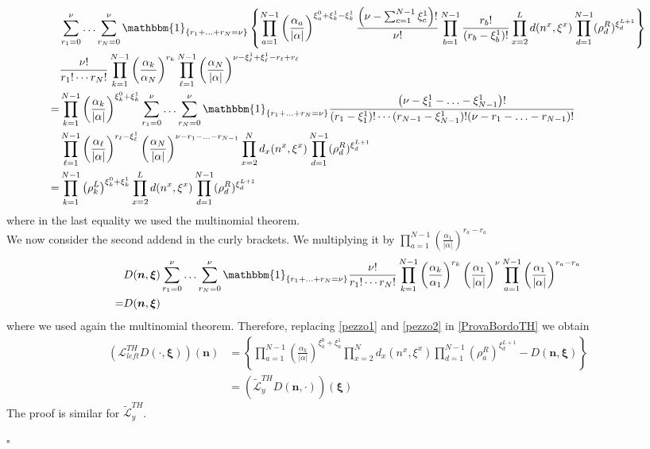 \documentclass[10pt]{article}
\numberwithin{equation}{section}
\numberwithin{equation}{subsection}
\begin{document}
\begin{align}\label{pezzo1}
	&\sum_{r_{1}=0}^{\nu}\ldots\sum_{r_{N}=0}^{\nu}\mathbbm{1}_{\{r_{1}+\ldots+r_{N}=\nu\}}\left\{\prod_{a=1}^{N-1}\left(\frac{\alpha_{a}}{|\alpha|}\right)^{\xi_{a}^{0}+\xi_{k}^{1}-\xi_{k}^{1}}\frac{\left(\nu-\sum_{c=1}^{N-1}\xi_{c}^{1}\right)!}{\nu!}\prod_{b=1}^{N-1}\frac{r_{b}!}{(r_{b}-\xi^{1}_{b})!}\prod_{x=2}^{L}d(n^{x},\xi^{x})\prod_{d=1}^{N-1}(\rho_{d}^{R})^{\xi_{d}^{L+1}}\right\}\nonumber\\&	\frac{\nu!}{r_{1}!\cdots r_{N}!}\prod_{k=1}^{N-1}\left(\frac{\alpha_{k}}{\alpha_{N}}\right)^{r_{k}}\prod_{\ell=1}^{N-1}\left(\frac{\alpha_{N}}{|\alpha|}\right)^{\nu-\xi_{\ell}^{1}+\xi_{\ell}^{1}-r_{\ell}+r_{\ell}}\nonumber\\=&
	\prod_{k=1}^{N-1}\left(\frac{\alpha_{k}}{|\alpha|}\right)^{\xi_{k}^{0}+\xi_{k}^{1}}\sum_{r_{1}=0}^{\nu}\ldots\sum_{r_{N}=0}^{\nu}\mathbbm{1}_{\{r_{1}+\ldots+r_{N}=\nu\}}	\frac{\left(\nu-\xi_{1}^{1}-\ldots-\xi_{N-1}^{1}\right)!}{(r_{1}-\xi_{1}^{1})!\cdots(r_{N-1}-\xi_{N-1}^{1})!(\nu-r_{1}-\ldots-r_{N-1})!}\nonumber\\&
	\prod_{\ell=1}^{N-1}\left(\frac{\alpha_{\ell}}{|\alpha|}\right)^{r_{\ell}-\xi_{\ell}^{1}}\left(\frac{\alpha_{N}}{|\alpha|}\right)^{\nu-r_{1}-\ldots-r_{N-1}}\prod_{x=2}^{N}d_{x}(n^{x},\xi^{x})\prod_{d=1}^{N-1}(\rho_{d}^{R})^{\xi_{d}^{L+1}}\nonumber
	\\=&
	\prod_{k=1}^{N-1}\left(\rho_{k}^{L}\right)^{\xi_{k}^{0}+\xi_{k}^{1}}\prod_{x=2}^{L}d(n^{x},\xi^{x})\prod_{d=1}^{N-1}(\rho_{d}^{R})^{\xi_{d}^{L+1}}
\end{align}
where in the last equality we used the multinomial theorem. \\ We now consider the second addend in the curly brackets.
We multiplying it by $\prod_{a=1}^{N-1}\left(\frac{\alpha_{1}}{|\alpha|}\right)^{r_{a}-r_{a}}$ 
\begin{equation}\label{pezzo2}
	\begin{split}
	&D(\bm{n},\bm{\xi})\sum_{r_{1}=0}^{\nu}\ldots\sum_{r_{N}=0}^{\nu}\mathbbm{1}_{\{r_{1}+\ldots+r_{N}=\nu\}}\frac{\nu!}{r_{1}!\cdots r_{N}!}\prod_{k=1}^{N-1}\left(\frac{\alpha_{k}}{\alpha_{1}}\right)^{r_{k}}\left(\frac{\alpha_{1}}{|\alpha|}\right)^{\nu}\prod_{a=1}^{N-1}\left(\frac{\alpha_{1}}{|\alpha|}\right)^{r_{a}-r_{a}}\\=&D(\bm{n},\bm{\xi})
	\end{split}
\end{equation}
where we used again the multinomial theorem. Therefore, replacing \eqref{pezzo1} and \eqref{pezzo2} in \eqref{ProvaBordoTH} we obtain 
\begin{align}
	\left(\mathcal{L}_{left}^{TH}D(\cdot,\bm{\xi})\right)(\bm{n})&=\left\{\prod_{a=1}^{N-1}\left(\frac{\alpha_{k}}{|\alpha|}\right)^{\xi_{a}^{0}+\xi_{a}^{1}}\prod_{x=2}^{N}d_{x}(n^{x},\xi^{x})\prod_{d=1}^{N-1}(\rho_{a}^{R})^{\xi_{d}^{L+1}}-D(\bm{n},\bm{\xi})\right\}
	\\&=
	\left(\widetilde{\mathcal{L}}_{y}^{TH}D(\bm{n},\cdot)\right)(\bm{\xi})
\end{align}
The proof is similar for $\widetilde{\mathcal{L}}_{y}^{TH}$. 
\begin{flushright}
	$\square$
\end{flushright}
\end{document}
